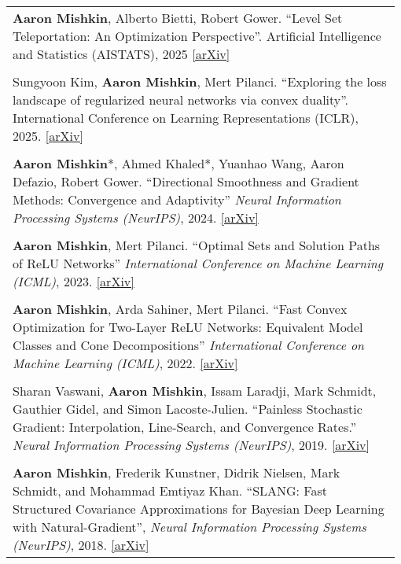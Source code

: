 \documentclass[10pt]{article}
\begin{document}
\begin{longtable}{L{0.98\linewidth}}
    \textbf{Aaron Mishkin}, Alberto Bietti, Robert Gower. ``Level Set Teleportation: An Optimization Perspective''. Artificial Intelligence and Statistics (AISTATS), 2025 \href{https://arxiv.org/abs/2403.03362}{[arXiv]} \\  \\
    Sungyoon Kim, \textbf{Aaron Mishkin}, Mert Pilanci. ``Exploring the loss landscape of regularized neural networks via convex duality''.
    International Conference on Learning Representations (ICLR), 2025. \href{https://arxiv.org/abs/2411.07729}{[arXiv]} \\  \\
    \textbf{Aaron Mishkin}*, Ahmed Khaled*, Yuanhao Wang, Aaron Defazio, Robert Gower. ``Directional Smoothness and Gradient Methods: Convergence and Adaptivity'' \textit{Neural Information Processing Systems (NeurIPS)}, 2024. \href{https://arxiv.org/abs/2403.04081}{[arXiv]}                               \\  \\
    \textbf{Aaron Mishkin}, Mert Pilanci. ``Optimal Sets and Solution Paths of ReLU Networks'' \textit{International Conference on Machine Learning (ICML)}, 2023. \href{https://arxiv.org/abs/2306.00119}{[arXiv]}                                                                                                             \\  \\
    \textbf{Aaron Mishkin}, Arda Sahiner, Mert Pilanci. ``Fast Convex Optimization for Two-Layer ReLU Networks: Equivalent Model Classes and Cone Decompositions'' \textit{International Conference on Machine Learning (ICML)}, 2022. \href{https://arxiv.org/abs/2202.01331}{[arXiv]}                                         \\  \\
    Sharan Vaswani, \textbf{Aaron Mishkin}, Issam Laradji, Mark Schmidt, Gauthier
    Gidel, and Simon Lacoste-Julien.
    ``Painless Stochastic Gradient: Interpolation, Line-Search, and Convergence Rates.'' \textit{Neural Information Processing Systems (NeurIPS)}, 2019. \href{https://arxiv.org/abs/1905.09997}{[arXiv]}                                                                                                                       \\  \\
    \textbf{Aaron Mishkin}, Frederik Kunstner, Didrik Nielsen, Mark Schmidt, and Mohammad Emtiyaz Khan. ``SLANG: Fast Structured Covariance Approximations for Bayesian Deep Learning with Natural-Gradient'', \textit{Neural Information Processing Systems (NeurIPS)}, 2018. \href{https://arxiv.org/abs/1811.04504}{[arXiv]} 
\end{longtable}
\end{document}
